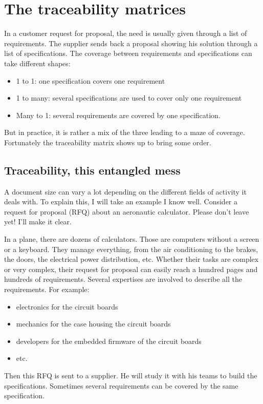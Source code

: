 \setchapterpreamble[u]{\margintoc}
\chapter{The traceability matrices}
\label{sec:TraceabilityMatrices}

In a customer request for proposal, the need is usually given through a list of requirements. The supplier sends back a proposal showing his solution through a list of specifications. The coverage between requirements and specifications can take different shapes:

\begin{itemize}
    \item 1 to 1: one specification covers one requirement
    \item 1 to many: several specifications are used to cover only one requirement
    \item Many to 1: several requirements are covered by one specification.
\end{itemize}

But in practice, it is rather a mix of the three leading to a maze of coverage. Fortunately the traceability matrix shows up to bring some order.


\section{Traceability, this entangled mess}
A document size can vary a lot depending on the different fields of activity it deals with. To explain this, I will take an example I know well. Consider a request for proposal (RFQ) about an aeronautic calculator. Please don’t leave yet! I’ll make it clear.

In a plane, there are dozens of calculators. Those are computers without a screen or a keyboard. They manage everything, from the air conditioning to the brakes, the doors, the electrical power distribution, etc. Whether their tasks are complex or very complex, their request for proposal can easily reach a hundred pages and hundreds of requirements. Several expertises are involved to describe all the requirements. For example:

\begin{itemize}
    \item electronics for the circuit boards
    \item mechanics for the case housing the circuit boards
    \item developers for the embedded firmware of the circuit boards
    \item etc.
\end{itemize}
Then this RFQ is sent to a supplier. He will study it with his teams to build the specifications. Sometimes several requirements can be covered by the same specification.

